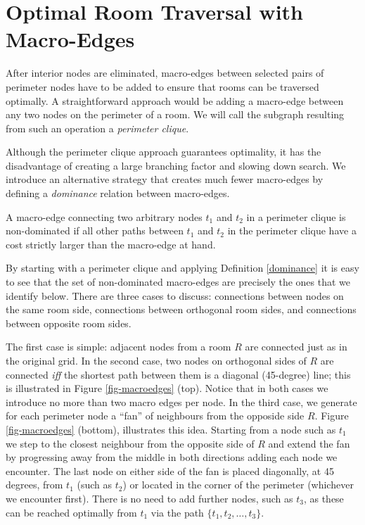 \section{Optimal Room Traversal with Macro-Edges}

After interior nodes are eliminated, macro-edges between selected pairs of
perimeter nodes have to be added to ensure that rooms can be traversed
optimally.  A straightforward approach would be adding a macro-edge between any
two nodes on the perimeter of a room.  We will call the subgraph resulting from
such an operation a \emph{perimeter clique}.

Although the perimeter clique approach guarantees optimality, it has the
disadvantage of creating a large branching factor and slowing down search.  We
introduce an alternative strategy that creates much fewer macro-edges by
defining a \emph{dominance} relation between macro-edges.
%

\begin{definition}
\label{def:dominance}
A macro-edge connecting two arbitrary nodes $t_1$ and $t_2$ in a perimeter
clique is non-dominated if all other paths between $t_1$ and $t_2$ in the
perimeter clique have a cost strictly larger than the macro-edge at hand.
\end{definition}

By starting with a perimeter clique and applying Definition \ref{dominance} it
is easy to see that the set of non-dominated macro-edges are precisely the ones
that we identify below.  There are three cases to discuss: connections between
nodes on the same room side, connections between orthogonal room sides, and
connections between opposite room sides.

The first case is simple: adjacent nodes from a room $R$ are connected just as
in the original grid.  In the second case, two nodes on orthogonal sides of $R$
are connected \emph{iff} the shortest path between them is a diagonal
(45-degree) line; this is illustrated in Figure \ref{fig-macroedges} (top).
Notice that in both cases we introduce no more than two macro edges per node.
In the third case, we generate for each perimeter node a ``fan'' of neighbours
from the opposide side $R$.  Figure \ref{fig-macroedges} (bottom), illustrates
this idea.  Starting from a node such as $t_{1}$ we step to the closest
neighbour from the opposite side of $R$ and extend the fan by progressing away
from the middle in both directions adding each node we encounter.  The last node
on either side of the fan is placed diagonally, at 45 degrees, from $t_{1}$
(such as $t_{2}$) or located in the corner of the perimeter (whichever we
encounter first).  There is no need to add further nodes, such as $t_{3}$, as
these can be reached optimally from $t_1$ via the path $\lbrace t_1, t_2, \dots,
t_3\rbrace$.

